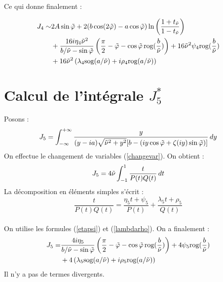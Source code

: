 Ce qui donne finalement :

\begin{equation}
\begin{split}
J_4\sim &2A\sin\tilde{\varphi} +2(b\cos(2\tilde{\varphi})-a\cos\tilde{\varphi})\ln\left(\frac{1+t_{\tilde{\nu}}}{1-t_{\tilde{\nu}}}\right)\\
&+\frac{16i\eta_4\tilde{\nu}^2}{b/\tilde{\nu}-\sin\tilde{\varphi}}\left(\frac{\pi}{2}-\tilde{\varphi}-\cos\tilde{\varphi} \,\mbox{rog}(\frac{b}{\tilde{\nu}}) \right)+16\tilde{\nu}^2\psi_4 \mbox{rog}(\frac{b}{\tilde{\nu}} )\\
&+16\tilde{\nu}^2\left(\lambda_4 \mbox{sog}(a/\tilde{\nu})+i\rho_4 \mbox{rog}(a/\tilde{\nu}) \right)
\end{split}
\label{valJ4}
\end{equation}

\section{Calcul de l'intégrale $J_5^*$}
\label{calculJ5}
Posons :
\begin{equation}
J_5=\int_{-\infty}^{+\infty} \frac{y}{(y-ia)\sqrt{\tilde{\nu}^2+y^2}\lbrack b-( iy\cos \tilde{\varphi}+ \zeta(iy)\sin \tilde{\varphi}) \rbrack}\,dy
\label{defJ5}
\end{equation}
On effectue le changement de variables (\ref{changevar}). On obtient :
$$ J_5=4\tilde{\nu}\int_{-1}^1 \frac{t}{P(t)Q(t)}\,dt $$
La décomposition en éléments simples s'écrit :
$$\frac{t}{P(t)Q(t)}=\frac{\eta_5 t+\psi_5}{P(t)}+\frac{\lambda_5 t +\rho_5}{Q(t)}$$
\paragraph{}

On utilise les formules (\ref{etapsi}) et (\ref{lambdarho}). On a finalement :
\begin{equation}
\begin{split}
J_5=&\frac{4i\eta_5}{b/\tilde{\nu}-\sin\tilde{\varphi}}\left(\frac{\pi}{2}-\tilde{\varphi}-\cos\tilde{\varphi} \,\mbox{rog}(\frac{b}{\tilde{\nu}}) \right)+4\psi_5 \mbox{rog}(\frac{b}{\tilde{\nu}} )\\
&+4\left(\lambda_5 \mbox{sog}(a/\tilde{\nu})+i\rho_5 \mbox{rog}(a/\tilde{\nu}) \right)
\end{split}
\label{valJ5}
\end{equation}
Il n'y a pas de termes divergents.


